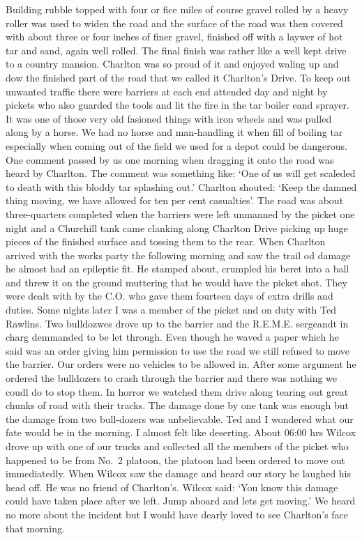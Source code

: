 Building rubble topped with four or fice miles of course gravel rolled
by a heavy roller was used to widen the road and the surface of the
road was then covered with about three or four inches of finer gravel,
finished off with a laywer of hot tar and sand, again well rolled. The
final finish was rather like a well kept drive to a country
mansion. Charlton was so proud of it and enjoyed waling up and dow the
finished part of the road that we called it Charlton's Drive. To keep
out unwanted traffic there were barriers at each end attended day and
night by pickets who also guarded the tools and lit the fire in the
tar boiler eand sprayer. It was one of those very old fasioned things
with iron wheels and was pulled along by a horse. We had no horse and
man-handling it when fill of boiling tar especially when coming out of
the field we used for a depot could be dangerous. One comment passed
by us one morning when dragging it onto the road was heard by
\lieutenant Charlton. The comment was something like: `One of us will get
scaleded to death with this bloddy tar splashing out.' Charlton
shouted: `Keep the damned thing moving, we have allowed for ten per
cent casualties'. The road was about three-quarters completed when the
barriers were left unmanned by the picket one night and a Churchill
tank came clanking along Charlton Drive picking up huge pieces of the
finished surface and tossing them to the rear. When Charlton arrived
with the works party the following morning and saw the trail od damage
he almost had an epileptic fit. He stamped about, crumpled his beret
into a ball and threw it on the ground muttering that he would have
the picket shot. They were dealt with by the C.O. who gave them
fourteen days of extra drills and duties. Some nights later I was a
member of the picket and on duty with Ted Rawlins. Two bulldozwes
drove up to the barrier and the R.E.M.E. sergeandt in charg demmanded
to be let through. Even though he waved a paper which he said was an
order giving him permission to use the road we still refused to move
the barrier. Our orders were no vehicles to be allowed in. After some
argument he ordered the bulldozers to crash through the barrier and
there was nothing we coudl do to stop them. In horror we watched them
drive along tearing out great chunks of road with their tracks. The
damage done by one tank was enough but the damage from two bull-dozers
was unbelievable. Ted and I wondered what our fate would be in the
morning. I almost felt like deserting. About 06:00 hrs \sergeant Wilcox
drove up with one of our trucks and collected all the members of the
picket who happened to be from No.~2 platoon, the platoon had been
ordered to move out immediatedly. When Wilcox saw the damage and heard
our story he laughed his head off. He was no friend of
\lieutenant Charlton's. Wilcox said: `You know this damage could have taken
place after we left. Jump aboard and lets get moving.' We heard no
more about the incident but I would have dearly loved to see
Charlton's face that morning.

